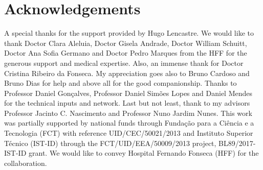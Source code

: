 
\section{Acknowledgements}
\label{sec:sec012}

A special thanks for the support provided by Hugo Lencastre. We would like to thank Doctor Clara Aleluia, Doctor Gisela Andrade, Doctor William Schuitt, Doctor Ana Sofia Germano and Doctor Pedro Marques from the HFF for the generous support and medical expertise. Also, an immense thank for Doctor Cristina Ribeiro da Fonseca. My appreciation goes also to Bruno Cardoso and Bruno Dias for help and above all for the good companionship. Thanks to Professor Daniel Gon\c{c}alves, Professor Daniel Sim\~{o}es Lopes and Daniel Mendes for the technical inputs and network. Last but not least, thank to my advisors Professor Jacinto C. Nascimento and Professor Nuno Jardim Nunes. This work was partially supported by national funds through Funda\c{c}\~{a}o para a Ci\^{e}ncia e a Tecnologia (FCT) with reference UID/CEC/50021/2013 and Instituto Superior T\'{e}cnico (IST-ID) through the FCT/UID/EEA/50009/2013 project, BL89/2017-IST-ID grant. We would like to convey Hospital Fernando Fonseca (HFF) for the collaboration.